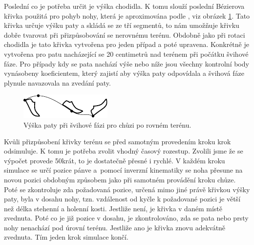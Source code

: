 Poslední co je potřeba určit je výška chodidla. K tomu slouží poslední Bézierova křivka použitá pro pohyb nohy, která je aproximována podle \cite{DadashiMarianiRochatEtAl2014}, viz obrázek \ref{fig:swingHeight}. Tato křivka určuje výšku paty a skládá se ze tří segmentů, to nám umožňuje křivku dobře tvarovat při přizpůsobování se nerovnému terénu. Obdobně jako při rotaci chodidla je tato křivka vytvořena pro jeden případ a poté upravena. Konkrétně je vytvořena pro patu nacházející se 20 centimetrů nad terénem při počátku švihové fáze. Pro případy kdy se pata nachází výše nebo níže jsou všechny kontrolní body vynásobeny koeficientem, který zajistí aby výška paty odpovídala a švihová fáze plynule navazovala na zvedání paty.

\begin{figure}[h]
	\centering
	\includegraphics[width=0.5\linewidth]{fig/legSwingCurve_excel.pdf}
	\caption{Výška paty při švihové fázi pro chůzi po rovném terénu.}
	\label{fig:swingHeight}
\end{figure}

Kvůli přizpůsobení křivky terénu se před samotným provedením kroku krok odsimuluje. K tomu je potřeba zvolit vhodný časový rozestup. Zvolili jsme že se výpočet provede 50krát, to je dostatečně přesné i rychlé. V každém kroku simulace se určí pozice pánve a~pomocí inverzní kinematiky se noha přesune na novou pozici obdobným způsobem jako při samotném provádění kroku chůze. Poté se zkontroluje zda požadovaná pozice, určená mimo jiné právě křivkou výšky paty, byla v dosahu nohy, tzn. vzdálenost od kyčle k požadované pozici je větší než délka stehenní a holenní kosti. Jestliže není, je křivka v daném místě zvednuta. Poté co je již pozice v dosahu, je zkontrolováno, zda se pata nebo prsty nohy nenachází pod úrovní terénu. Jestliže ano je křivka znovu adekvátně zvednuta. Tím jeden krok simulace končí.

